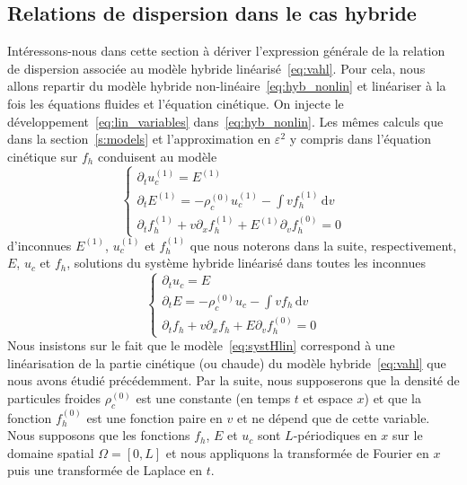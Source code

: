 \subsection{Relations de dispersion dans le cas hybride}

Intéressons-nous dans cette section à dériver l'expression générale de la relation de dispersion associée au modèle hybride linéarisé~\eqref{eq:vahl}. Pour cela, nous allons repartir du modèle hybride non-linéaire~\eqref{eq:hyb_nonlin} et linéariser à la fois les équations fluides et l'équation cinétique. On injecte le développement~\eqref{eq:lin_variables} dans~\eqref{eq:hyb_nonlin}. Les mêmes calculs que dans la section~\ref{s:models} et l'approximation en $\varepsilon^2$ y compris dans l'équation cinétique sur $f_h$ conduisent au modèle
$$
  \begin{cases}
    \partial_tu_c^{(1)}=E^{(1)}\\
    \partial_tE^{(1)}=-\rho_c^{(0)}u_c^{(1)}-\int v f_h^{(1)}\,\mathrm{d}v\\
    \partial_t f_h^{(1)}+ v\partial_xf_h^{(1)}+ E^{(1)}\partial_vf_h^{(0)}=0
  \end{cases}
$$ 
d'inconnues $E^{(1)}$, $u_c^{(1)}$ et $f_h^{(1)}$ que nous noterons dans la suite, respectivement, $E$, $u_c$ et $f_h$, solutions du système hybride linéarisé dans toutes les inconnues
\begin{equation}
  \begin{cases}
    \partial_t u_c = E \\
    \partial_t E = -\rho_c^{(0)}u_c - \int vf_h\,\mathrm{d}v \\
    \partial_t f_h + v\partial_x f_h + E\partial_v f_h^{(0)} = 0
  \end{cases}
\label{eq:systHlin}
\end{equation}
Nous insistons sur le fait que le modèle~\eqref{eq:systHlin} correspond à une linéarisation de la partie cinétique (ou chaude) du modèle hybride~\eqref{eq:vahl} que nous avons étudié précédemment. Par la suite, nous supposerons que la densité de particules froides $\rho_c^{(0)}$ est une constante (en temps $t$ et espace $x$) et que la fonction $f_h^{(0)}$ est une fonction paire en $v$ et ne dépend que de cette variable. Nous supposons que les fonctions $f_h$, $E$ et $u_c$ sont $L$-périodiques en $x$ sur le domaine spatial $\Omega = [0,L]$ et nous appliquons la transformée de Fourier en $x$ puis une transformée de Laplace en $t$.

